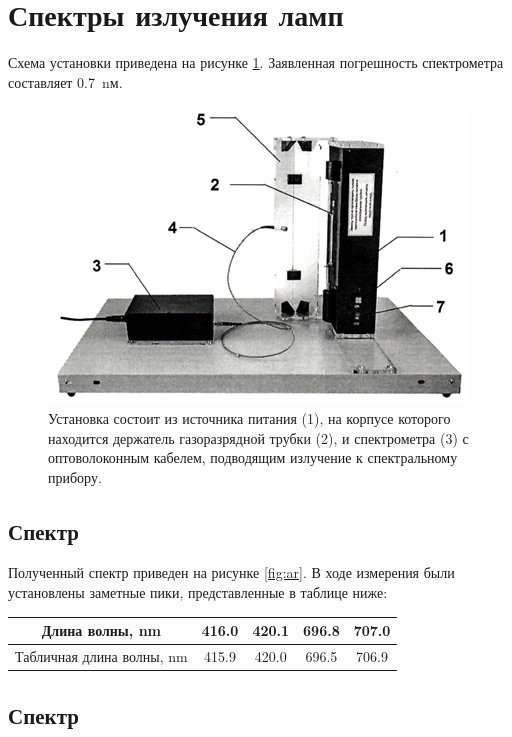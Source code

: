 \documentclass[a4paper, 12pt]{article}
\begin{document}
\section{Спектры излучения ламп}

Схема установки приведена на рисунке \ref{fig:spectrometer}. Заявленная погрешность спектрометра составляет 0.7~nм.


\begin{figure}[H]
	\centering
	\includegraphics[width=0.7\linewidth]{spectrometer.png}
	\caption{Установка состоит из источника питания (1), на корпусе которого находится держатель газоразрядной трубки (2), и спектрометра (3) с оптоволоконным кабелем, подводящим излучение к спектральному прибору.}
	\label{fig:spectrometer}
\end{figure}

\subsection{Спектр }

Полученный спектр приведен на рисунке \ref{fig:ar}. В ходе измерения были установлены заметные пики, представленные в таблице ниже:

\begin{center}
	\begin{tabular}{|c|c|c|c|c|}
		\hline
		Длина волны, nm & 416.0 & 420.1 & 696.8 & 707.0 \\
		\hline
		Табличная длина волны, nm & 415.9 & 420.0 & 696.5 & 706.9 \\
		\hline
	\end{tabular}
\end{center}






\subsection{Спектр }
\end{document}
